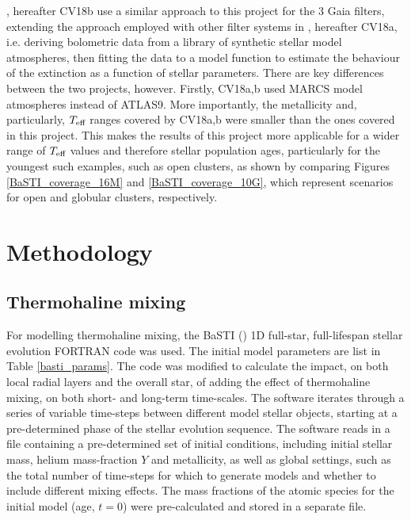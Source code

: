 \documentclass[12pt, a4paper]{report}
\begin{document}
\cite{2018MNRAS.479L.102C}, hereafter CV18b use a similar approach to this project for the 3 Gaia filters, extending the approach employed with other filter systems in \cite{2018MNRAS.475.5023C}, hereafter CV18a, i.e. deriving bolometric data from a library of synthetic stellar model atmospheres, then fitting the data to a model function to estimate the behaviour of the extinction as a function of stellar parameters. There are key differences between the two projects, however. Firstly, CV18a,b used MARCS model atmospheres instead of ATLAS9. More importantly, the metallicity and, particularly, $T_{\textnormal{eff}}$ ranges covered by CV18a,b were smaller than the ones covered in this project. This makes the results of this project more applicable for a wider range of $T_{\textnormal{eff}}$ values and therefore stellar population ages, particularly for the youngest such examples, such as open clusters, as shown by comparing Figures \ref{BaSTI_coverage_16M} and \ref{BaSTI_coverage_10G}, which represent scenarios for open and globular clusters, respectively.

\chapter{Methodology} \label{Methodology}
\section{Thermohaline mixing}

For modelling thermohaline mixing, the BaSTI (\cite{2004ApJ...612..168P}) 1D full-star, full-lifespan stellar evolution FORTRAN code was used. The initial model parameters are list in Table \ref{basti_params}. The code was modified to calculate the impact, on both local radial layers and the overall star, of adding the effect of thermohaline mixing, on both short- and long-term time-scales. The software iterates through a series of variable time-steps between different model stellar objects, starting at a pre-determined phase of the stellar evolution sequence. The software reads in a file containing a pre-determined set of initial conditions, including initial stellar mass, helium mass-fraction $Y$ and metallicity, as well as global settings, such as the total number of time-steps for which to generate models and whether to include different mixing effects. The mass fractions of the atomic species for the initial model (age, $t = 0$) were pre-calculated and stored in a separate file.
\end{document}
